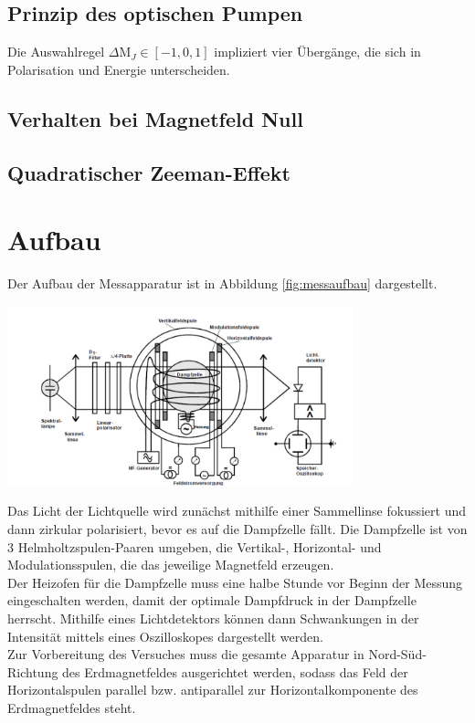 \documentclass[]{scrartcl}
\begin{document}
\subsection{Prinzip des optischen Pumpen}
Die Auswahlregel $\Delta$M$_J\in[-1,0,1]$ impliziert vier Übergänge, die sich in Polarisation und Energie unterscheiden.

\subsection{Verhalten bei Magnetfeld Null}

\subsection{Quadratischer Zeeman-Effekt}


\section{Aufbau}
Der Aufbau der Messapparatur ist in Abbildung \ref{fig:messaufbau} dargestellt. 
\begin{center}
	\includegraphics[width=10cm]{images/messaufbau.png}
	\label{fig:messaufbau}
\end{center}
Das Licht der Lichtquelle wird zunächst mithilfe einer Sammellinse fokussiert und dann zirkular polarisiert, bevor es auf die Dampfzelle fällt. Die Dampfzelle ist von 3 Helmholtzspulen-Paaren umgeben, die Vertikal-, Horizontal- und Modulationsspulen, die das jeweilige Magnetfeld erzeugen. \\
Der Heizofen für die Dampfzelle muss eine halbe Stunde vor Beginn der Messung eingeschalten werden, damit der optimale Dampfdruck in der Dampfzelle herrscht. Mithilfe eines Lichtdetektors können dann Schwankungen in der Intensität mittels eines Oszilloskopes dargestellt werden. \\
Zur Vorbereitung des Versuches muss die gesamte Apparatur in Nord-Süd-Richtung des Erdmagnetfeldes ausgerichtet werden, sodass das Feld der Horizontalspulen parallel bzw. antiparallel zur Horizontalkomponente des Erdmagnetfeldes steht. \\
\end{document}

